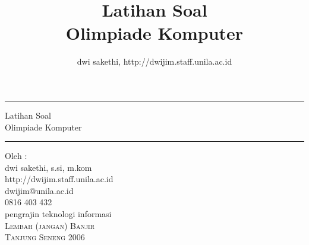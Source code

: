 \documentclass[a4paper,10pt,makeidx]{article}
\title{{\HUGE Latihan Soal \\ Olimpiade Komputer}}
\author{dwi sakethi, http://dwijim.staff.unila.ac.id}
\begin{document}
\begin{center}
 \thispagestyle{empty}
 \newcommand{\HRule}{\rule{\linewidth}{1mm}}
 \setlength{\parindent}{0mm}
 \setlength{\parskip}{0mm}
 \pagebreak
   \HRule
   \begin{flushright}
      \Large Latihan Soal      \\[5mm]
      \Huge Olimpiade Komputer \\[5mm]
    \end{flushright}
    \HRule


    \begin{flushright}
      \Large Oleh : \\[5mm]
      \Large dwi sakethi, s.si, m.kom      \\[2mm]
      \small http://dwijim.staff.unila.ac.id \\[2mm]
             dwijim@unila.ac.id     \\[2mm]
             0816 403 432                  \\[2mm]
             pengrajin teknologi informasi \\[5mm]
      \Large \textsc{Lembah (jangan) Banjir} \\[5mm]
      \Large \textsc{Tanjung Seneng 2006} \\[5mm]
    \end{flushright}
\end{center}
\newpage
{}
\end{document}
